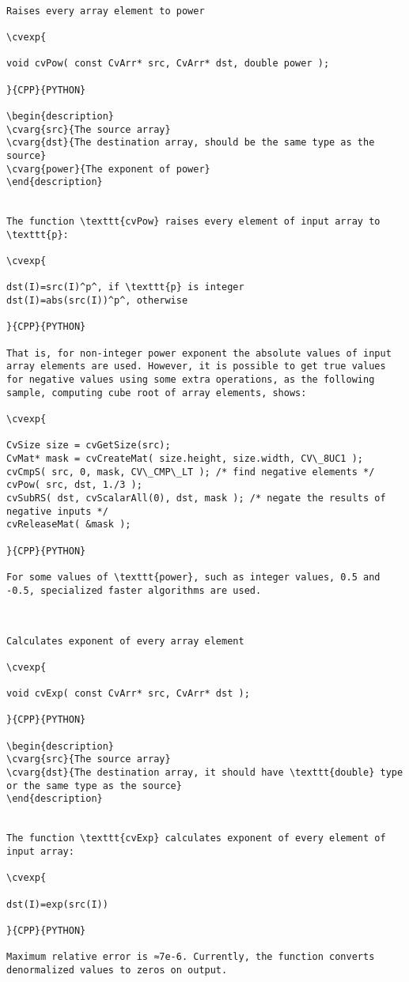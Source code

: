 \begin{verbatim}

Raises every array element to power

\cvexp{

void cvPow( const CvArr* src, CvArr* dst, double power );

}{CPP}{PYTHON}

\begin{description}
\cvarg{src}{The source array}
\cvarg{dst}{The destination array, should be the same type as the source}
\cvarg{power}{The exponent of power}
\end{description}


The function \texttt{cvPow} raises every element of input array to \texttt{p}:

\cvexp{

dst(I)=src(I)^p^, if \texttt{p} is integer
dst(I)=abs(src(I))^p^, otherwise

}{CPP}{PYTHON}

That is, for non-integer power exponent the absolute values of input array elements are used. However, it is possible to get true values for negative values using some extra operations, as the following sample, computing cube root of array elements, shows:

\cvexp{

CvSize size = cvGetSize(src);
CvMat* mask = cvCreateMat( size.height, size.width, CV\_8UC1 );
cvCmpS( src, 0, mask, CV\_CMP\_LT ); /* find negative elements */
cvPow( src, dst, 1./3 );
cvSubRS( dst, cvScalarAll(0), dst, mask ); /* negate the results of negative inputs */
cvReleaseMat( &mask );

}{CPP}{PYTHON}

For some values of \texttt{power}, such as integer values, 0.5 and -0.5, specialized faster algorithms are used.


\end{verbatim}
\label{Exp}
\begin{verbatim}

Calculates exponent of every array element

\cvexp{

void cvExp( const CvArr* src, CvArr* dst );

}{CPP}{PYTHON}

\begin{description}
\cvarg{src}{The source array}
\cvarg{dst}{The destination array, it should have \texttt{double} type or the same type as the source}
\end{description}


The function \texttt{cvExp} calculates exponent of every element of input array:

\cvexp{

dst(I)=exp(src(I))

}{CPP}{PYTHON}

Maximum relative error is ≈7e-6. Currently, the function converts denormalized values to zeros on output.


\end{verbatim}
